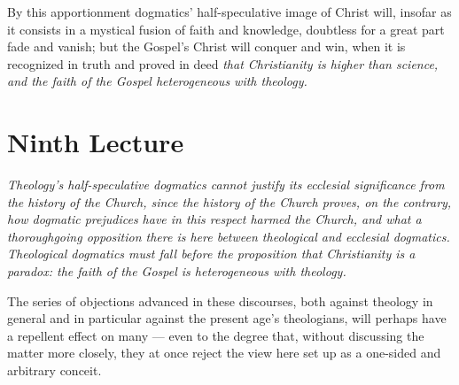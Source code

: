\documentclass[12pt,a4paper]{book}
\begin{document}
By this apportionment dogmatics' half-speculative image of Christ will, insofar as it consists
in a mystical fusion of faith and knowledge, doubtless for a great part fade and vanish; but the
Gospel's Christ will conquer and win, when it is recognized in truth and proved in deed
\emph{that Christianity is higher than science, and the faith of the Gospel heterogeneous with
theology.}

\chapter*{Ninth Lecture}
\label{ch:forel9}

\begin{center}\itshape
Theology's half-speculative dogmatics cannot justify its ecclesial
significance from the history of the Church, since the history of the Church
proves, on the contrary, how dogmatic prejudices have in this respect harmed
the Church, and what a thoroughgoing opposition there is here between
theological and ecclesial dogmatics. Theological dogmatics must fall before
the proposition that Christianity is a paradox: the faith of the Gospel is
heterogeneous with theology.
\end{center}

The series of objections advanced in these discourses, both against theology in general and
in particular against the present age's theologians, will perhaps have a repellent effect on
many --- even to the degree that, without discussing the matter more closely, they at once
reject the view here set up as a one-sided and arbitrary conceit.
\end{document}
